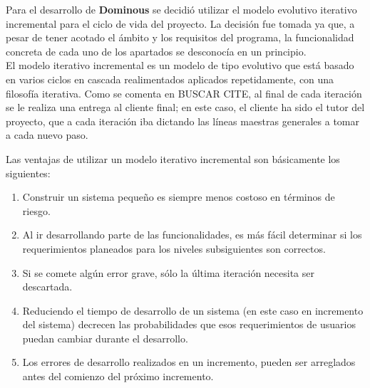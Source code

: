 

Para el desarrollo de \textbf{Dominous} se decidió utilizar el modelo evolutivo iterativo incremental para el ciclo de
vida del proyecto. La decisión fue tomada ya que, a pesar de tener acotado el ámbito y los requisitos del programa,
la funcionalidad concreta de cada uno de los apartados se desconocía en un principio.\\

El modelo iterativo incremental es un modelo de tipo evolutivo que está basado en varios ciclos en cascada realimentados aplicados
repetidamente, con una filosofía iterativa. Como se comenta en BUSCAR CITE, al final de cada iteración se le
realiza una entrega al cliente final; en este caso, el cliente ha sido el tutor del proyecto, que a cada iteración iba
dictando las líneas maestras generales a tomar a cada nuevo paso.

Las ventajas de utilizar un modelo iterativo incremental son básicamente los siguientes:
\begin{enumerate}
    \item Construir un sistema pequeño es siempre menos costoso en términos de riesgo.
    \item Al ir desarrollando parte de las funcionalidades, es más fácil determinar si los requerimientos
            planeados para los niveles subsiguientes son correctos.
    \item Si se comete algún error grave, sólo la última iteración necesita ser descartada.
    \item Reduciendo el tiempo de desarrollo de un sistema (en este caso en incremento del sistema) decrecen las
            probabilidades que esos requerimientos de usuarios puedan cambiar durante el desarrollo.
    \item Los errores de desarrollo realizados en un incremento, pueden ser arreglados antes del comienzo del próximo incremento.
\end{enumerate}

